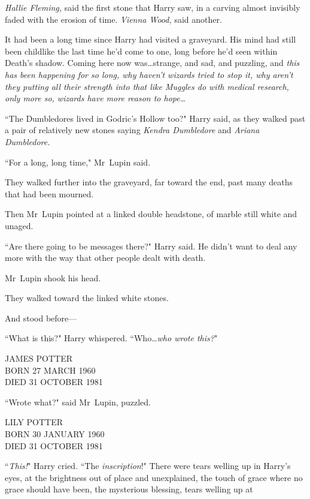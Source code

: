 \emph{Hallie Fleming,} said the first stone that Harry saw, in a carving almost invisibly faded with the erosion of time. \emph{Vienna Wood,} said another.

It had been a long time since Harry had visited a graveyard. His mind had still been childlike the last time he'd come to one, long before he'd seen within Death's shadow. Coming here now was…strange, and sad, and puzzling, and \emph{this has been happening for so long, why haven't wizards tried to stop it, why aren't they putting all their strength into that like Muggles do with medical research, only more so, wizards have more reason to hope…}

``The Dumbledores lived in Godric's Hollow too?" Harry said, as they walked past a pair of relatively new stones saying \emph{Kendra Dumbledore} and \emph{Ariana Dumbledore.}

``For a long, long time," Mr~Lupin said.

They walked further into the graveyard, far toward the end, past many deaths that had been mourned.

Then Mr~Lupin pointed at a linked double headstone, of marble still white and unaged.

``Are there going to be messages there?" Harry said. He didn't want to deal any more with the way that other people dealt with death.

Mr~Lupin shook his head.

They walked toward the linked white stones.

And stood before—

``What is this?" Harry whispered. ``Who…\emph{who wrote this?}"

\begin{center}
JAMES POTTER\\
BORN 27 MARCH 1960\\
DIED 31 OCTOBER 1981
\end{center}

``Wrote what?" said Mr~Lupin, puzzled.

\begin{center}
LILY POTTER\\
BORN 30 JANUARY 1960\\
DIED 31 OCTOBER 1981
\end{center}

``\emph{This!}" Harry cried. ``The \emph{inscription}!" There were tears welling up in Harry's eyes, at the brightness out of place and unexplained, the touch of grace where no grace should have been, the mysterious blessing, tears welling up at

